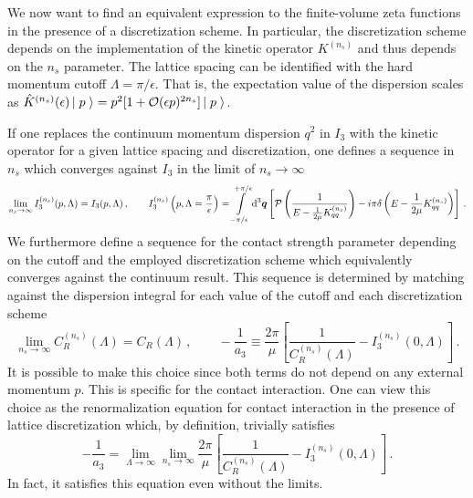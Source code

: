 We now want to find an equivalent expression to the finite-volume zeta functions in the presence of a discretization scheme.
In particular, the discretization scheme depends on the implementation of the kinetic operator $K^{(n_s)}$ and thus depends on the $n_s$ parameter.
The lattice spacing can be identified with the hard momentum cutoff $\Lambda = \pi / \epsilon$.
That is, the expectation value of the dispersion scales as $\hat K^{(n_s)}(\epsilon) \left|\;p\;\right\rangle = p^2 [1 + \mathcal O(\epsilon p)^{2 n_s}]\left|\;p\;\right\rangle$.

If one replaces the continuum momentum dispersion $q^2$ in $I_3$ with the kinetic operator for a given lattice spacing and discretization, one defines a sequence in $n_s$ which converges against $I_3$ in the limit of $n_s \to \infty$
\begin{equation}
	\lim\limits_{n_s \to \infty} I^{(n_s)}_3(p, \Lambda) = I_3(p, \Lambda)
	\, , \qquad
	I^{(n_s)}_3\left(p, \Lambda=\frac{\pi}{\epsilon} \right)
	=
	    \int\limits_{-\pi/\epsilon}^{+\pi/\epsilon}
        \mathrm{d}^3 \boldsymbol{q}
        \left[
            \mathcal{P} \left(
                \frac{1}{
                    E - \frac{1}{2\mu} K_{qq}^{(n_s)} }
                \right)
            -i \pi \delta\left(E - \frac{1}{2\mu}K_{qq}^{(n_s)}\right)
        \right]
        \, .
\end{equation}
We furthermore define a sequence for the contact strength parameter depending on the cutoff and the employed discretization scheme which equivalently converges against the continuum result.
This sequence is determined by matching against the dispersion integral for each value of the cutoff and each discretization scheme
\begin{equation}\label{eq:dispersion-renormalization}
	\lim\limits_{n_s \to \infty} C^{(n_s)}_R(\Lambda) = C_R(\Lambda) \, ,
	\qquad
	- \frac{1}{a_3}
	\equiv
	\frac{2 \pi}{\mu}
		\left[
		\frac{1}{C_R^{(n_s)}(\Lambda)} - I_3^{(n_s)}(0, \Lambda)
		\right]
	\, .
\end{equation}
It is possible to make this choice since both terms do not depend on any external momentum $p$.
This is specific for the contact interaction.
One can view this choice as the renormalization equation for contact interaction in the presence of lattice discretization which, by definition, trivially satisfies
\begin{equation}
	- \frac{1}{a_3}
	=
	\lim\limits_{\Lambda \to \infty} \lim\limits_{n_s \to \infty}
	\frac{2 \pi}{\mu}
		\left[
		\frac{1}{C_R^{(n_s)}(\Lambda)} - I_3^{(n_s)}(0, \Lambda)
		\right]
	\, .
\end{equation}
In fact, it satisfies this equation even without the limits.


